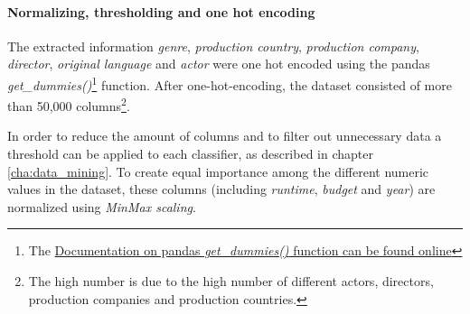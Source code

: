 \paragraph{Normalizing, thresholding and one hot encoding}
The extracted information \textit{genre},\textit{ production country}, \textit{production company}, \textit{director}, \textit{original language} and \textit{actor} were one hot encoded using the pandas \textit{get\_dummies()}\footnote{The \hyperref{https://pandas.pydata.org/pandas-docs/stable/generated/pandas.get_dummies.html}{documentation}{pd.getDumies}{Documentation on pandas \textit{get\_dummies()} function can be found online}} function. After one-hot-encoding, the dataset consisted of more than 50,000 columns\footnote{The high number is due to the high number of different actors, directors, production companies and production countries.}.

In order to reduce the amount of columns and to filter out unnecessary data a threshold can be applied to each classifier, as described in chapter \ref{cha:data_mining}. To create equal importance among the different numeric values in the dataset, these columns (including \textit{runtime}, \textit{budget} and \textit{year}) are normalized using \textit{MinMax scaling}.





